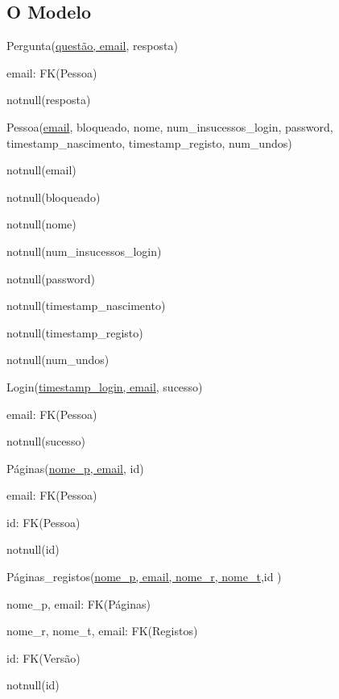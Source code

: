 \documentclass[11pt,a4paper]{article}
\begin{document}
\subsection{O Modelo}

\begin{description}[noitemsep]
	\item Pergunta(\underline{quest\~ao, email}, resposta)
	\item email: FK(Pessoa)
	\item notnull(resposta)
\end{description}

\begin{description}[noitemsep]
	\item Pessoa(\underline{email}, bloqueado, nome, num\_insucessos\_login, password, timestamp\_nascimento, timestamp\_registo, num\_undos)
	\item notnull(email)
	\item notnull(bloqueado)
	\item notnull(nome)
	\item notnull(num\_insucessos\_login)
	\item notnull(password)
	\item notnull(timestamp\_nascimento)
	\item notnull(timestamp\_registo)
	\item notnull(num\_undos)
\end{description}

\begin{description}[noitemsep]
	\item Login(\underline{timestamp\_login, email}, sucesso)
	\item email: FK(Pessoa)
	\item notnull(sucesso)
\end{description}

\begin{description}[noitemsep]
	\item P\'{a}ginas(\underline{nome\_p, email}, id)
	\item email: FK(Pessoa)
	\item id: FK(Pessoa)
	\item notnull(id)
\end{description}

\begin{description}[noitemsep]
	\item P\'{a}ginas\_registos(\underline{nome\_p, email, nome\_r, nome\_t},id )
	\item nome\_p, email: FK(P\'{a}ginas)
	\item nome\_r, nome\_t, email: FK(Registos)
	\item id: FK(Vers\~{a}o)
	\item notnull(id)
\end{description}
\end{document}

